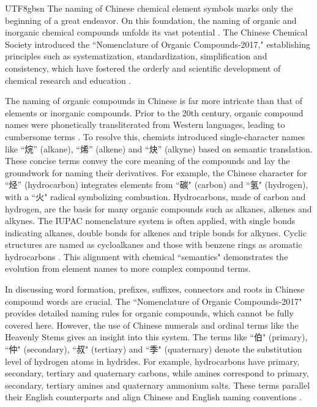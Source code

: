 \documentclass[conference]{IEEEtran}
\begin{document}
\begin{CJK*}{UTF8}{gbsn}
The naming of Chinese chemical element symbols marks only the beginning of a great endeavor. On this foundation, the naming of organic and inorganic chemical compounds unfolds its vast potential \citep{wang2010nomencl}. The Chinese Chemical Society introduced the “Nomenclature of Organic Compounds-2017," \citep{ccs2017nomenclature} establishing principles such as systematization, standardization, simplification and consistency, which have fostered the orderly and scientific development of chemical research and education  \citep{maning2019ex}.

The naming of organic compounds in Chinese is far more intricate than that of elements or inorganic compounds. Prior to the 20th century, organic compound names were phonetically transliterated from Western languages, leading to cumbersome terms \citep{hejuan2016nomencl}. To resolve this, chemists introduced single-character names like “烷” (alkane), “烯” (alkene) and “炔” (alkyne) based on semantic translation. These concise terms convey the core meaning of the compounds and lay the groundwork for naming their derivatives. For example, the Chinese character for “烃” (hydrocarbon) integrates elements from “碳" (carbon) and “氢" (hydrogen), with a “火" radical symbolizing combustion. Hydrocarbons, made of carbon and hydrogen, are the basis for many organic compounds such as alkanes, alkenes and alkynes. The IUPAC nomenclature system \citep{favre2014nomenclature} is often applied, with single bonds indicating alkanes, double bonds for alkenes and triple bonds for alkynes. Cyclic structures are named as cycloalkanes and those with benzene rings as aromatic hydrocarbons \citep{hejuan2016nomencl}. This alignment with chemical “semantics" demonstrates the evolution from element names to more complex compound terms. %

In discussing word formation, prefixes, suffixes, connectors and roots in Chinese compound words are crucial. The “Nomenclature of Organic Compounds-2017" provides detailed naming rules for organic compounds, which cannot be fully covered here. However, the use of Chinese numerals and ordinal terms like the Heavenly Stems gives an insight into this system. %
The terms like “伯" (primary), “仲" (secondary), “叔" (tertiary) and “季" (quaternary) denote the substitution level of hydrogen atoms in hydrides. For example, hydrocarbons have primary, secondary, tertiary and quaternary carbons, while amines correspond to primary, secondary, tertiary amines and quaternary ammonium salts. These terms parallel their English counterparts and align Chinese and English naming conventions \citep{ccs2017nomenclature}.


\end{CJK*}
\end{document}
